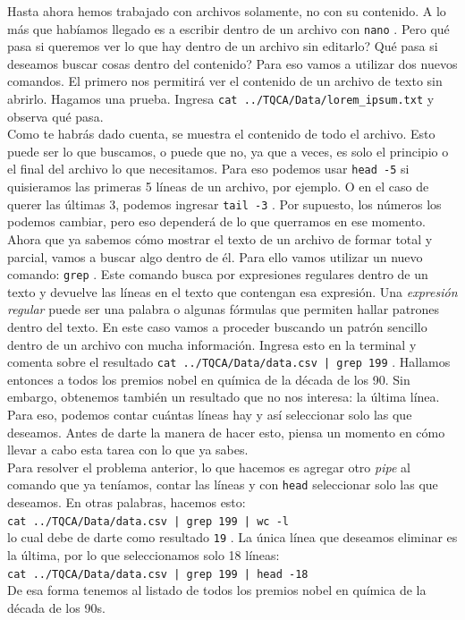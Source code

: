 \documentclass[10pt,letterpaper]{article}
\newcommand{\inlinecode}[1]{
\colorbox{light-gray}{\texttt{#1}}
}
\begin{document}
Hasta ahora hemos trabajado con archivos solamente, no con su contenido. A lo m\'as que hab\'iamos llegado es a escribir dentro de un archivo con \inlinecode{nano}. Pero qu\'e pasa si queremos ver lo que hay dentro de un archivo sin editarlo? Qu\'e pasa si deseamos buscar cosas dentro del contenido? Para eso vamos a utilizar dos nuevos comandos. El primero nos permitir\'a ver el contenido de un archivo de texto sin abrirlo. Hagamos una prueba. Ingresa \inlinecode{cat ../TQCA/Data/lorem\_ipsum.txt} y observa qu\'e pasa.\\

Como te habr\'as dado cuenta, se muestra el contenido de todo el archivo. Esto puede ser lo que buscamos, o puede que no, ya que a veces, es solo el principio o el final del archivo lo que necesitamos. Para eso podemos usar \inlinecode{head -5} si quisieramos las primeras 5 l\'ineas de un archivo, por ejemplo. O en el caso de querer las \'ultimas 3, podemos ingresar \inlinecode{tail -3}. Por supuesto, los n\'umeros los podemos cambiar, pero eso depender\'a de lo que querramos en ese momento.\\

Ahora que ya sabemos c\'omo mostrar el texto de un archivo de formar total y parcial, vamos a buscar algo dentro de \'el. Para ello vamos utilizar un nuevo comando: \inlinecode{grep}. Este comando busca por expresiones regulares dentro de un texto y devuelve las l\'ineas en el texto que contengan esa expresi\'on. Una \emph{expresi\'on regular} puede ser una palabra o algunas f\'ormulas que permiten hallar patrones dentro del texto. En este caso vamos a proceder buscando un patr\'on sencillo dentro de un archivo con mucha informaci\'on. Ingresa esto en la terminal y comenta sobre el resultado \inlinecode{cat ../TQCA/Data/data.csv | grep 199}. Hallamos entonces a todos los premios nobel en qu\'imica de la d\'ecada de los 90. Sin embargo, obtenemos tambi\'en un resultado que no nos interesa: la \'ultima l\'inea. Para eso, podemos contar cu\'antas l\'ineas hay y as\'i seleccionar solo las que deseamos. Antes de darte la manera de hacer esto, piensa un momento en c\'omo llevar a cabo esta tarea con lo que ya sabes.\\

Para resolver el problema anterior, lo que hacemos es agregar otro \emph{pipe} al comando que ya ten\'iamos, contar las l\'ineas y con \inlinecode{head} seleccionar solo las que deseamos. En otras palabras, hacemos esto:\\
\inlinecode{cat ../TQCA/Data/data.csv | grep 199 | wc -l}\\
lo cual debe de darte como resultado \inlinecode{19}. La \'unica l\'inea que deseamos eliminar es la \'ultima, por lo que seleccionamos solo 18 l\'ineas:\\
\inlinecode{cat ../TQCA/Data/data.csv | grep 199 | head -18}\\
De esa forma tenemos al listado de todos los premios nobel en qu\'imica de la d\'ecada de los 90s.
\end{document}
